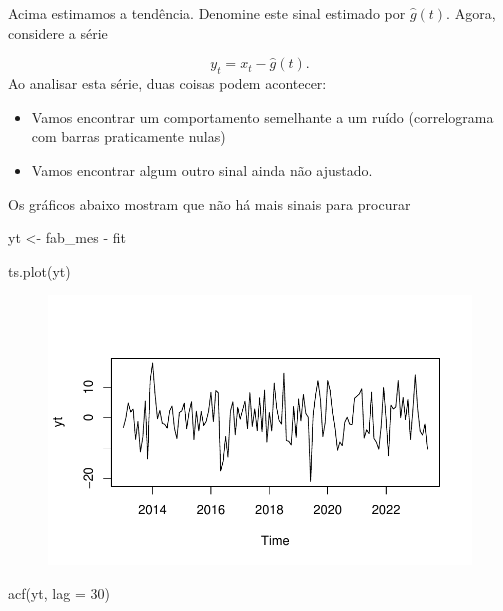 \documentclass[
  letterpaper,
  DIV=11,
  numbers=noendperiod]{scrreprt}
\newenvironment{Shaded}{\begin{snugshade}}{\end{snugshade}}
\newcommand{\AttributeTok}[1]{\textcolor[rgb]{0.40,0.45,0.13}{#1}}
\newcommand{\DecValTok}[1]{\textcolor[rgb]{0.68,0.00,0.00}{#1}}
\newcommand{\FunctionTok}[1]{\textcolor[rgb]{0.28,0.35,0.67}{#1}}
\newcommand{\NormalTok}[1]{\textcolor[rgb]{0.00,0.23,0.31}{#1}}
\newcommand{\OtherTok}[1]{\textcolor[rgb]{0.00,0.23,0.31}{#1}}
\newcommand{\SpecialCharTok}[1]{\textcolor[rgb]{0.37,0.37,0.37}{#1}}
\begin{document}
Acima estimamos a tendência. Denomine este sinal estimado por
\(\hat{g}(t)\). Agora, considere a série

\[y_t=x_t-\hat{g}(t).\] Ao analisar esta série, duas coisas podem
acontecer:

\begin{itemize}
\item
  Vamos encontrar um comportamento semelhante a um ruído (correlograma
  com barras praticamente nulas)
\item
  Vamos encontrar algum outro sinal ainda não ajustado.
\end{itemize}

Os gráficos abaixo mostram que não há mais sinais para procurar

\begin{Shaded}
\begin{Highlighting}[]
\NormalTok{yt }\OtherTok{\textless{}{-}}\NormalTok{ fab\_mes }\SpecialCharTok{{-}}\NormalTok{ fit}

\FunctionTok{ts.plot}\NormalTok{(yt)}
\end{Highlighting}
\end{Shaded}

\begin{figure}[H]

{\centering \includegraphics{ferramentas_files/figure-pdf/unnamed-chunk-4-1.pdf}

}

\end{figure}

\begin{Shaded}
\begin{Highlighting}[]
\FunctionTok{acf}\NormalTok{(yt, }\AttributeTok{lag =} \DecValTok{30}\NormalTok{)}
\end{Highlighting}
\end{Shaded}
\end{document}
